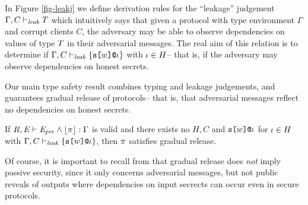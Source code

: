 In Figure \ref{fig-leakj} we define derivation rules for the
``leakage'' judgement $\Gamma,C \vdash_{\mathit{leak}} T$ which intuitively says
that given a protocol with type environment $\Gamma$ and corrupt
clients $C$, the adversary may be able to observe dependencies on
values of type $T$ in their adversarial messages.  The real aim of
this relation is to determine if
$\Gamma,C \vdash_{\mathit{leak}} \{ \texttt{s[}w\texttt{]}\texttt{@}\iota \}$ with $\iota \in H$-- that is,
if the adversary may observe dependencies on honest secrets.

Our main type safety result combines typing and leakage judgements,
and guarantees gradual release of protocols-- that is, that adversarial
messages reflect no dependencies on honest secrets.
\begin{theorem}
  If $R,\mathit{E} \vdash \mathit{E}_{\mathit{pre}} \wedge \lfloor \pi \rfloor : \Gamma$ is valid and there exists no $H,C$ 
  and  $\texttt{s[}w\texttt{]}\texttt{@}\iota$ for $\iota \in H$ with $\Gamma,C \vdash_{\mathit{leak}} \{ \texttt{s[}w\texttt{]}\texttt{@}\iota \}$,
  then $\pi$ satisfies gradual release.
\end{theorem}

\leakjfig

Of course, it is important to recall from \cite{skalka-near-ppdp24}
that gradual release does \emph{not} imply passive security, since it
only concerns adversarial messages, but not public reveals of outputs
where dependencies on input secrects can occur even in secure
protocols.

\begin{comment}
\subsection{Examples}

\begin{verbatimtab}
m[s1]@2 := (s[1] - r[local] - r[x])@1
m[s1]@3 := r[x]@1

// m[s1]@2 : { c(r[x]@1, { c(r[local]@1, {s[1]@1} ) }
// m[s1]@3 : { r[x]@1 }
\end{verbatimtab}

\begin{verbatimtab}
m[x]@1 := s2(s[x],-r[x],r[x])@2

// m[x]@1 == s[x]@2 + -r[x]@2 
// m[x]@1 : { c(r[x]@2, { s[x]@2 }) } 

m[y]@1 := OT(s[y]@1,-r[y],r[y])@2

// m[y]@1 == s[y]@1 + -r[y]@2
// m[y]@1 : { c(r[y]@2, { s[y]@1 }) } 
\end{verbatimtab}
\end{comment}
